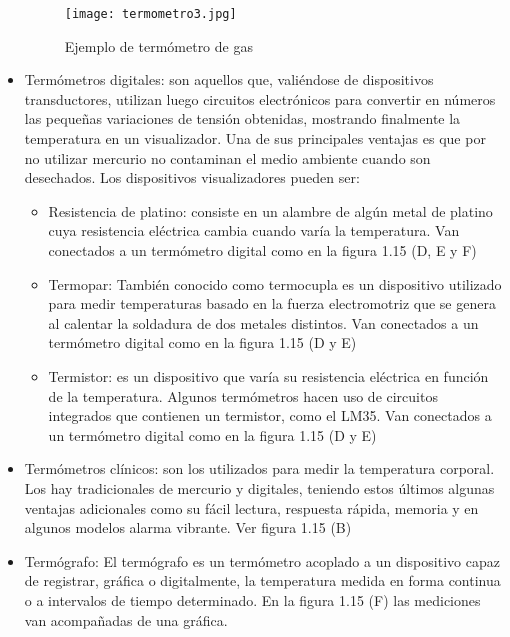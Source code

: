 \begin{itemize}
	\begin{figure}[H]
		\centering
		\texttt{[image: termometro3.jpg]}
		\caption{Ejemplo de termómetro de gas}
	\end{figure}
	
	\item Termómetros digitales: son aquellos que, valiéndose de dispositivos transductores, utilizan luego circuitos electrónicos para convertir en números las pequeñas variaciones de tensión obtenidas, mostrando finalmente la temperatura en un visualizador. Una de sus principales ventajas es que por no utilizar mercurio no contaminan el medio ambiente cuando son desechados. Los dispositivos visualizadores pueden ser:
	
	\begin{itemize}
		
		\item Resistencia de platino: consiste en un alambre de algún metal de platino cuya resistencia eléctrica cambia cuando varía la temperatura. Van conectados a un termómetro digital como en la figura 1.15 (D, E y F)
		
		\item Termopar: También conocido como termocupla es un dispositivo utilizado para medir temperaturas basado en la fuerza electromotriz que se genera al calentar la soldadura de dos metales distintos. Van conectados a un termómetro digital como en la figura 1.15 (D y E)
		
		\item Termistor:  es un dispositivo que varía su resistencia eléctrica en función de la temperatura. Algunos termómetros hacen uso de circuitos integrados que contienen un termistor, como el LM35. Van conectados a un termómetro digital como en la figura 1.15 (D y E)
		
	\end{itemize}
	
	\item Termómetros clínicos: son los utilizados para medir la temperatura corporal. Los hay tradicionales de mercurio y digitales, teniendo estos últimos algunas ventajas adicionales como su fácil lectura, respuesta rápida, memoria y en algunos modelos alarma vibrante. Ver figura 1.15 (B)
	
	\item Termógrafo: El termógrafo es un termómetro acoplado a un dispositivo capaz de registrar, gráfica o digitalmente, la temperatura medida en forma continua o a intervalos de tiempo determinado. En la figura 1.15 (F) las mediciones van acompañadas de una gráfica.
	
\end{itemize}

